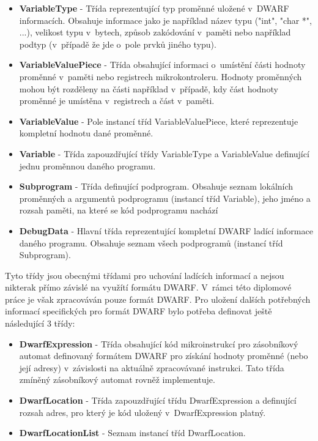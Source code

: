 \begin{itemize}
\item \textbf{VariableType} - Třída reprezentující typ proměnné uložené v~DWARF informacích. Obsahuje informace jako je například název typu ("int", "char *", ...), velikost typu v~bytech, způsob zakódování v~paměti nebo například podtyp (v~případě že jde o~pole prvků jiného typu).
\item \textbf{VariableValuePiece} - Třída obsahující informaci o~umístění části hodnoty proměnné v~paměti nebo registrech mikrokontroleru. Hodnoty proměnných mohou být rozděleny na části například v~případě, kdy část hodnoty proměnné je umístěna v~registrech a část v~paměti.
\item \textbf{VariableValue} - Pole instancí tříd VariableValuePiece, které reprezentuje kompletní hodnotu dané proměnné.
\item \textbf{Variable} - Třída zapouzdřující třídy VariableType a VariableValue definující jednu proměnnou daného programu.
\item \textbf{Subprogram} - Třída definující podprogram. Obsahuje seznam lokálních proměnných a argumentů podprogramu (instancí tříd Variable), jeho jméno a rozsah paměti, na které se kód podprogramu nachází
\item \textbf{DebugData} - Hlavní třída reprezentující kompletní DWARF ladící informace daného programu. Obsahuje seznam všech podprogramů (instancí tříd Subprogram).
\end{itemize}

Tyto třídy jsou obecnými třídami pro uchování ladících informací a nejsou nikterak přímo závislé na využítí formátu DWARF. V~rámci této diplomové práce je však zpracováván pouze formát DWARF. Pro uložení dalších potřebných informací specifických pro formát DWARF bylo potřeba definovat ještě následující 3 třídy:

\begin{itemize}
\item \textbf{DwarfExpression} - Třída obsahující kód mikroinstrukcí pro zásobníkový automat definovaný formátem DWARF pro získání hodnoty proměnné (nebo její adresy) v~závislosti na aktuálně zpracovávané instrukci. Tato třída zmíněný zásobníkový automat rovněž implementuje.
\item \textbf{DwarfLocation} - Třída zapouzdřující třídu DwarfExpression a definující rozsah adres, pro který je kód uložený v~DwarfExpression platný.
\item \textbf{DwarfLocationList} - Seznam instancí tříd DwarfLocation.
\end{itemize}

